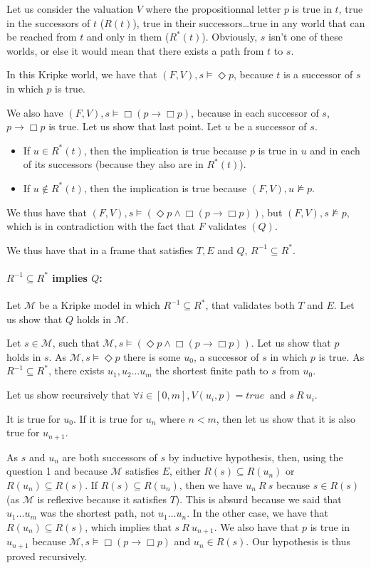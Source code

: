 \documentclass[10pt]{article}
\def\M{\mathcal{M}}
\begin{document}
Let us consider the valuation $V$ where the propositionnal letter $p$ is true in $t$, true in the successors of $t$ ($R(t)$), true in their successors\dots true in any world that can be reached from $t$ and only in them ($R^*(t)$). Obviously, $s$ isn't one of these worlds, or else it would mean that there exists a path from $t$ to $s$.


In this Kripke world, we have that $(F,V),s\models\Diamond p$, because $t$ is a successor of $s$ in which $p$ is true. 

We also have $(F,V),s\models\Box(p\rightarrow\Box p)$, because in each successor of $s$, $p\rightarrow\Box p$ is true. Let us show that last point. Let $u$ be a successor of $s$.

\begin{itemize}
\item If $u\in R^*(t)$, then the implication is true because $p$ is true in $u$ and in each of its successors (because they also are in $R^*(t)$).
\item If $u\not\in R^*(t)$, then the implication is true because $(F,V),u\not\models p$.
\end{itemize}

We thus have that $(F,V),s\models (\Diamond p\wedge\Box(p\rightarrow\Box p))$, but $(F,V),s\not\models p$, which is in contradiction with the fact that $F$ validates $(Q)$.

We thus have that in a frame that satisfies $T,E$ and $Q$, $R^{-1}\subseteq R^*$.


\paragraph{$R^{-1}\subseteq R^*$ implies $Q$:}
Let $\M$ be a Kripke model in which $R^{-1}\subseteq R^*$, that validates both $T$ and $E$. Let us show that $Q$ holds in $\M$.

Let $s\in\M$, such that $\M,s\models(\Diamond p\wedge\Box(p\rightarrow\Box p))$. Let us show that $p$ holds in $s$. As $\M,s\models\Diamond p$ there is some $u_0$, a successor of $s$ in which $p$ is true. As $R^{-1}\subseteq R^*$, there exists $u_1,u_2\dots u_m$ the shortest finite path to $s$ from $u_0$.

Let us show recursively that $\forall i\in[0,m], V(u_i,p)=\mathit{true\ } \text{ and\ } s\ R\ u_i$.

It is true for $u_0$.
If it is true for $u_n$ where $n<m$, then let us show that it is also true for $u_{n+1}$.

As $s$ and $u_n$ are both successors of $s$ by inductive hypothesis, then, using the question 1 and because $\M$ satisfies $E$, either $R(s)\subseteq R(u_n)$ or $R(u_n)\subseteq R(s)$. If $R(s)\subseteq R(u_n)$, then we have $u_n\ R\ s$ because $s\in R(s)$ (as $\M$ is reflexive because it satisfies $T$). This is absurd because we said that $u_1\dots u_m$ was the shortest path, not $u_1\dots u_n$. In the other case, we have that $R(u_n)\subseteq R(s)$, which implies that $s\ R\ u_{n+1}$. We also have that $p$ is true in $u_{n+1}$ because $\M,s\models\Box(p\rightarrow\Box p)$ and $u_n\in R(s)$. Our hypothesis is thus proved recursively.
\end{document}
